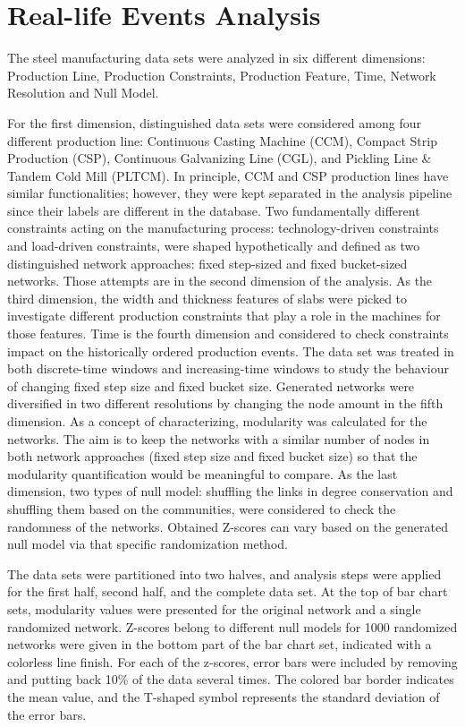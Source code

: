 \section{Real-life Events Analysis}
{\color{red} 
The steel manufacturing data sets were analyzed in six different dimensions: Production Line, Production Constraints, Production Feature, Time, Network Resolution and Null Model.

For the first dimension, distinguished data sets were considered among four different production line: Continuous Casting Machine (CCM), Compact Strip Production (CSP), Continuous Galvanizing Line (CGL), and Pickling Line \& Tandem Cold Mill (PLTCM). In principle, CCM and CSP production lines have similar functionalities; however, they were kept separated in the analysis pipeline since their labels are different in the database. Two fundamentally different constraints acting on the manufacturing process: technology-driven constraints and load-driven constraints, were shaped hypothetically and defined as two distinguished network approaches: fixed step-sized and fixed bucket-sized networks. Those attempts are in the second dimension of the analysis. As the third dimension, the width and thickness features of slabs were picked to investigate different production constraints that play a role in the machines for those features. Time is the fourth dimension and considered to check constraints impact on the historically ordered production events. The data set was treated in both discrete-time windows and increasing-time windows to study the behaviour of changing fixed step size and fixed bucket size. Generated networks were diversified in two different resolutions by changing the node amount in the fifth dimension. As a concept of characterizing, modularity was calculated for the networks. The aim is to keep the networks with a similar number of nodes in both network approaches (fixed step size and fixed bucket size) so that the modularity quantification would be meaningful to compare. As the last dimension, two types of null model: shuffling the links in degree conservation and shuffling them based on the communities, were considered to check the randomness of the networks. Obtained Z-scores can vary based on the generated null model via that specific randomization method.

The data sets were partitioned into two halves, and analysis steps were applied for the first half, second half, and the complete data set. At the top of bar chart sets, modularity values were presented for the original network and a single randomized network. Z-scores belong to different null models for 1000 randomized networks were given in the bottom part of the bar chart set, indicated with a colorless line finish. For each of the z-scores, error bars were included by removing and putting back 10\% of the data several times. The colored bar border indicates the mean value, and the T-shaped symbol represents the standard deviation of the error bars.
}

